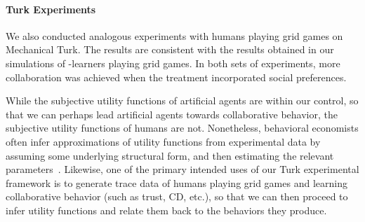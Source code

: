 
\vspace{\up}
\paragraph{Turk Experiments}
\label{sec:human}

We also conducted analogous experiments with humans playing grid games
on Mechanical Turk.
%
%
The results are consistent
with the results obtained in our simulations of \Q-learners playing
grid games.  In both sets of experiments, more collaboration was
achieved when the treatment incorporated social preferences.

While the subjective utility functions of artificial agents are within
our control, so that we can perhaps lead artificial agents towards
collaborative behavior, the subjective utility functions of humans are
not.  Nonetheless, behavioral economists often infer approximations of
utility functions from experimental data by assuming some underlying
structural form, and then estimating the relevant
parameters~\cite{blanco11,fisman07}.
Likewise, one of the primary intended uses of our Turk experimental
framework is to generate trace data of humans playing grid games and
learning collaborative behavior (such as trust, CD, etc.), so that we
can then proceed to infer utility functions and relate them back to
the behaviors they produce.

